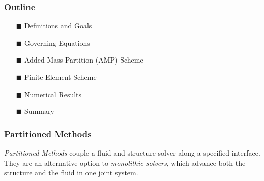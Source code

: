 \documentclass[8pt]{beamer}
\begin{document}

\begin{frame}
    \frametitle{Outline}
    \begin{itemize}
    \item[$\blacksquare$]  Definitions and Goals                              \\
    \item[$\blacksquare$]  Governing Equations                                \\
    \item[$\blacksquare$]  Added Mass Partition (AMP) Scheme                  \\
    \item[$\blacksquare$]  Finite Element Scheme                              \\
    \item[$\blacksquare$]  Numerical Results                                  \\
    \item[$\blacksquare$]  Summary                                            \\
    \end{itemize}
\end{frame}

\begin{frame}
    \frametitle{Partitioned Methods}
    \emph{Partitioned Methods} couple a fluid and structure solver along a
    specified interface. They are an alternative option to \emph{monolithic
    solvers}, which advance both the structure and the fluid in one joint
    system.
\end{frame}
\end{document}
